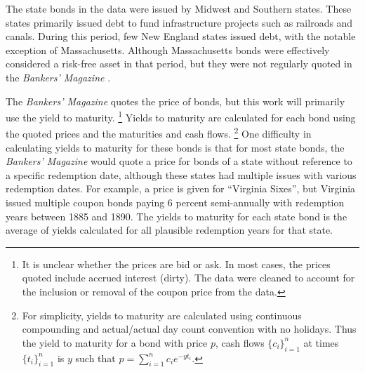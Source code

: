 The state bonds in the data were issued by Midwest and Southern states.
These states primarily issued debt to fund infrastructure projects such as railroads and canals.
During this period, few New England states issued debt, with the notable exception of Massachusetts.
Although Massachusetts bonds were effectively considered a risk-free asset in that period, but they were not regularly quoted in the \textit{Bankers' Magazine} \parencites[86]{Martin1871}{HomerSylla2005}{Macaulay1938}[80-85]{Officer2003}.

The \textit{Bankers' Magazine} quotes the price of bonds, but this work will primarily use the yield to maturity.%
\footnote{
  It is unclear whether the prices are bid or ask. In most cases, the prices quoted include accrued interest (dirty).
  The data were cleaned to account for the inclusion or removal of the coupon price from the data.
}
Yields to maturity are calculated for each bond using the quoted prices and the maturities and cash flows.
\footnote{
  For simplicity, yields to maturity are calculated using continuous compounding and actual/actual day count convention with no holidays.
  Thus the yield to maturity for a bond with price $p$, cash flows $\{c_{i}\}_{i = 1}^{n}$ at times $\{t_{i}\}_{i=1}^{n}$ is $y$ such that $p = \sum_{i=1}^{n} c_{i} e^{- y t_{i}}$.
}
One difficulty in calculating yields to maturity for these bonds is that for most state bonds, the \textit{Bankers' Magazine} would quote a price for bonds of a state without reference to a specific redemption date, although these states had multiple issues with various redemption dates.
For example, a price is given for ``Virginia Sixes'', but Virginia issued multiple coupon bonds paying 6 percent semi-annually with redemption years between 1885 and 1890.
The yields to maturity for each state bond is the average of yields calculated for all plausible redemption years for that state.


